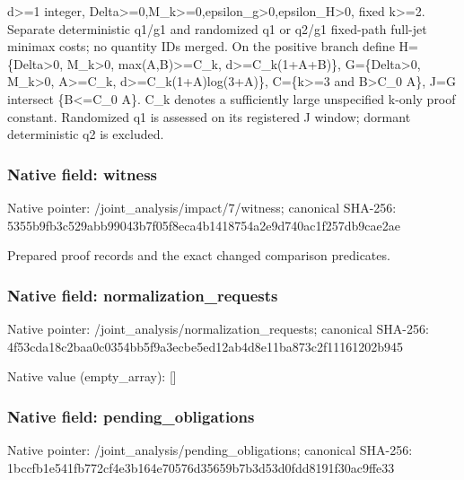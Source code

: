 \documentclass[10pt,a4paper]{article}
\begin{document}
\begingroup\raggedright\sloppy d>=\allowbreak{}1 integer,\allowbreak{} Delta>=\allowbreak{}0,\allowbreak{}M\_\allowbreak{}k>=\allowbreak{}0,\allowbreak{}epsilon\_\allowbreak{}g>0,\allowbreak{}epsilon\_\allowbreak{}H>0,\allowbreak{} fixed k>=\allowbreak{}2. Separate deterministic q1/\allowbreak{}g1 and randomized q1 or q2/\allowbreak{}g1 fixed-path full-jet minimax costs;\allowbreak{} no quantity IDs merged. On the positive branch define H=\allowbreak{}\{Delta>0,\allowbreak{} M\_\allowbreak{}k>0,\allowbreak{} max(A,\allowbreak{}B)>=\allowbreak{}C\_\allowbreak{}k,\allowbreak{} d>=\allowbreak{}C\_\allowbreak{}k(1+A+B)\},\allowbreak{} G=\allowbreak{}\{Delta>0,\allowbreak{} M\_\allowbreak{}k>0,\allowbreak{} A>=\allowbreak{}C\_\allowbreak{}k,\allowbreak{} d>=\allowbreak{}C\_\allowbreak{}k(1+A)log(3+A)\},\allowbreak{} C=\allowbreak{}\{k>=\allowbreak{}3 and B>C\_\allowbreak{}0 A\},\allowbreak{} J=\allowbreak{}G intersect \{B<=\allowbreak{}C\_\allowbreak{}0 A\}. C\_\allowbreak{}k denotes a sufficiently large unspecified k-only proof constant. Randomized q1 is assessed on its registered J window;\allowbreak{} dormant deterministic q2 is excluded.\par\endgroup

\subsubsection{Native field: witness}
Native pointer: /joint\_\allowbreak{}analysis/impact/7/witness; canonical SHA-256: 5355b9fb3c529abb99043b7f05f8eca4b1418754a2e9d740ac1f257db9cae2ae

\begingroup\raggedright\sloppy Prepared proof records and the exact changed comparison predicates.\par\endgroup

\subsubsection{Native field: normalization\_\allowbreak{}requests}
Native pointer: /joint\_\allowbreak{}analysis/normalization\_\allowbreak{}requests; canonical SHA-256: 4f53cda18c2baa0c0354bb5f9a3ecbe5ed12ab4d8e11ba873c2f11161202b945

Native value (empty\_\allowbreak{}array): []

\subsubsection{Native field: pending\_\allowbreak{}obligations}
Native pointer: /joint\_\allowbreak{}analysis/pending\_\allowbreak{}obligations; canonical SHA-256: 1bccfb1e541fb772cf4e3b164e70576d35659b7b3d53d0fdd8191f30ac9ffe33
\end{document}
